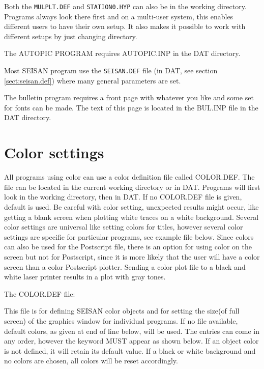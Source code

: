 Both the \texttt{MULPLT.DEF} and \texttt{STATION0.HYP} can also be in the working directory. Programs always look there first and on a multi-user system, this enables different users to have their own setup. It also makes it possible to work with different setups by just changing directory. 

The AUTOPIC PROGRAM requires AUTOPIC.INP in the DAT directory. 

Most SEISAN program use the \texttt{SEISAN.DEF} file (in DAT, see section \ref{sect:seisan.def}) where many general parameters are set. 

The bulletin program requires a front page with whatever you like and some set for fonts can be made. The text of this page is located in the BUL.INP file in the DAT directory. 

\section{Color settings}

All programs using color can use a color definition file called COLOR.DEF. The file can be located in the current working directory or in DAT. Programs will first look in the working directory, then in DAT. If no COLOR.DEF file is given, default is used. Be careful with color setting, unexpected results might occur, like getting a blank screen when plotting white traces on a white background. Several color settings are universal like setting colors for titles, however several color settings are specific for particular programs, see example file below. Since colors can also be used for the Postscript file, there is an option for using color on the screen but not for Postscript, since it is more likely that the user will have a color screen than a color Postscript plotter. Sending a color plot file to a black and white laser printer results in a plot with gray tones. 

The COLOR.DEF file:

This file is for defining SEISAN color objects
and for setting the size(of full screen) 
of the graphics 
window for individual programs. 
If no file available, default colors, as given at end of line below, 
will be used. The entries can come in any order, however the keyword 
MUST appear as shown below. If an object color is not defined, it 
will retain its default value. If a black or white background and 
no colors are chosen, all colors will be reset accordingly. 

